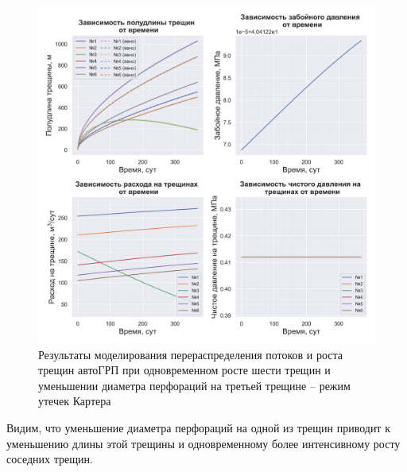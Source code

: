 \begin{figure}[H] 
\center
\includegraphics[width=\linewidth]{images/myimage13.jpg}
\caption{Результаты моделирования перераспределения потоков и роста трещин автоГРП при одновременном росте шести трещин и уменьшении диаметра перфораций на третьей трещине -- режим утечек Картера}
\label{fig:myimage13}
\end{figure}

Видим, что уменьшение диаметра перфораций на одной из трещин приводит к уменьшению длины этой трещины и одновременному более интенсивному росту соседних трещин.

%

